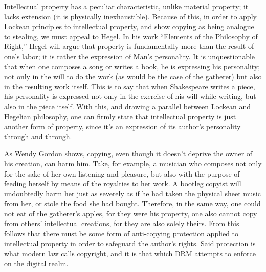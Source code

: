 \documentclass[12pt,letterpaper]{article}
\begin{document}
Intellectual property has a peculiar characteristic, unlike material property; it lacks extension (it is physically inexhaustible). Because of this, in order to apply Lockean principles to intellectual property, and show copying as being analogue to stealing, we must appeal to Hegel. In his work ``Elements of the Philosophy of Right,'' Hegel will argue that property is fundamentally more than the result of one's labor; it is rather the expression of Man's personality\autocite[\ppno~84--88]{hegel-1991}. It is unquestionable that when one composes a song or writes a book, he is expressing his personality; not only in the will to do the work (as would be the case of the gatherer) but also in the resulting work itself. This is to say that when Shakespeare writes a piece, his personality is expressed not only in the exercise of his will while writing, but also in the piece itself. With this, and drawing a parallel between Lockean and Hegelian philosophy, one can firmly state that intellectual property is just another form of property, since it's an expression of its author's personality through and through.

As Wendy Gordon shows, copying, even though it doesn't deprive the owner of his creation, can harm him. Take, for example, a musician who composes not only for the sake of her own listening and pleasure, but also with the purpose of feeding herself by means of the royalties to her work. A bootleg copyist will undoubtedly harm her just as severely as if he had taken the physical sheet music from her, or stole the food she had bought.\autocite[\pno~1548]{gordon-1993} Therefore, in the same way, one could not eat of the gatherer's apples, for they were his property, one also cannot copy from others' intellectual creations, for they are also solely theirs. From this follows that there must be some form of anti-copying protection applied to intellectual property in order to safeguard the author's rights. Said protection is what modern law calls copyright, and it is that which DRM attempts to enforce on the digital realm.
\end{document}
